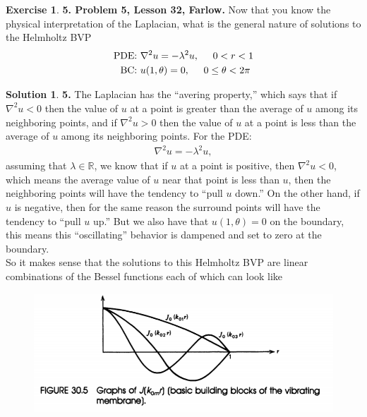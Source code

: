 \documentclass{book}
\theoremstyle{definition}
\newtheorem*{exer*}{Exercise}
\newtheorem*{sln*}{Solution}
\newcommand{\R}{\mathbb{R}}
\begin{document}
\newpage

\begin{exer*}\textbf{5. Problem 5, Lesson 32, Farlow.} Now that you know the physical interpretation of the Laplacian, what is the general nature of solutions to the Helmholtz BVP
	\begin{align*}
	\text{PDE: } & \laplacian u = -\lambda^2u, \hspace{0.5cm} 0 < r< 1\\
	\text{BC: } & u(1,\theta) = 0, \hspace{0.5cm}  0 \leq \theta < 2\pi
	\end{align*} 
	
	\begin{sln*}\textbf{5.} 
		The Laplacian has the ``avering property,'' which says that if $\nabla^2 u < 0$ then the value of $u$ at a point is greater than the average of $u$ among its neighboring points, and if $\nabla^2 u > 0$ then the value of $u$ at a point is less than the average of $u$ among its neighboring points. For the PDE:
		\begin{align*}
		\nabla^2 u = -\lambda^2 u,
		\end{align*}
		assuming that $\lambda \in \R$, we know that if $u$ at a point is positive, then $\nabla^2 u < 0$, which means the average value of $u$ near that point is less than $u$, then the neighboring points will have the tendency to ``pull $u$ down.'' On the other hand, if $u$ is negative, then for the same reason the surround points will have the tendency to ``pull $u$ up.'' But we also have that $u(1,\theta) = 0$ on the boundary, this means this ``oscillating'' behavior is dampened and set to zero at the boundary.\\
		
		So it makes sense that the solutions to this Helmholtz BVP are linear combinations of the Bessel functions each of which can look like
		\begin{figure}[h!]
			\centering
			\includegraphics[scale=0.75]{helmholtz.png}
		\end{figure} 
	\end{sln*}
\end{exer*}
\end{document}
